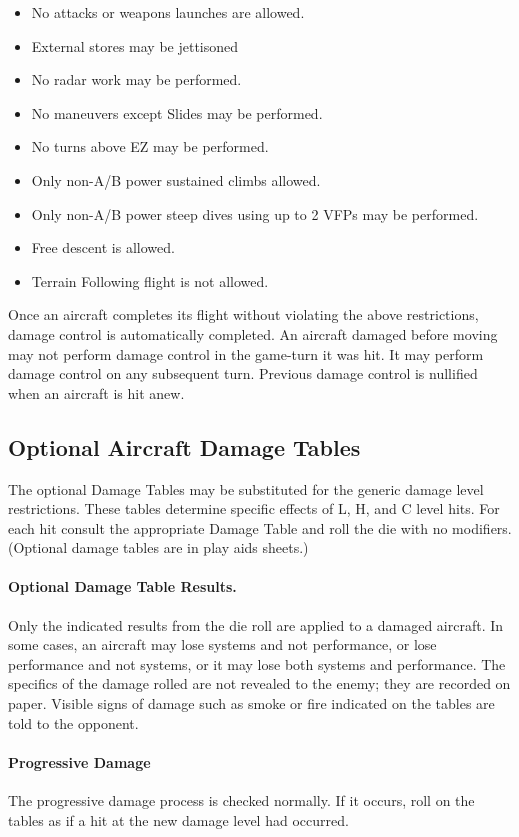 \begin{itemize}
    \item No attacks or weapons launches are allowed.
    \item External stores may be jettisoned
    \item No radar work may be performed.
    \item No maneuvers except Slides may be performed.
    \item No turns above EZ may be performed.
    \item Only non-A/B power sustained climbs allowed.
    \item Only non-A/B power steep dives using up to 2 VFPs may be performed.
    \item Free descent is allowed.
    \item Terrain Following flight is not allowed.
\end{itemize}

Once an aircraft completes its flight without violating the above restrictions, damage control is automatically completed. An aircraft damaged before moving may not perform damage control in the game-turn it was hit. It may perform damage control on any subsequent turn. Previous damage control is nullified when an aircraft is hit anew.

\subsection{Optional Aircraft Damage Tables}

The optional Damage Tables may be substituted for the generic damage level restrictions. These tables determine specific effects of L, H, and C level hits. For each hit consult the appropriate Damage Table and roll the die with no modifiers. (Optional damage tables are in play aids sheets.)

\paragraph{Optional Damage Table Results.} Only the indicated results from the die roll are applied to a damaged aircraft. In some cases, an aircraft may lose systems and not performance, or lose performance and not systems, or it may lose both systems and performance. The specifics of the damage rolled are not revealed to the enemy; they are recorded on paper. Visible signs of damage such as smoke or fire indicated on the tables are told to the opponent.

\paragraph{Progressive Damage} The progressive damage process is checked normally. If it occurs, roll on the tables as if a hit at the new damage level had occurred.

